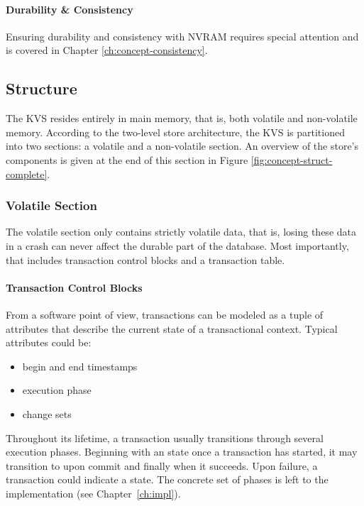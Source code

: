 \paragraph{Durability \& Consistency}

Ensuring durability and consistency with \ac{NVRAM} requires special attention
and is covered in Chapter \ref{ch:concept-consistency}.

\vfill

\subsection{Structure}

The \ac{KVS} resides entirely in main memory, that is, both volatile and
non-volatile memory. According to the two-level store architecture, the \ac{KVS}
is partitioned into two sections: a volatile and a non-volatile section. An
overview of the store's components is given at the end of this section in Figure
\ref{fig:concept-struct-complete}.

\subsubsection{Volatile Section}

The volatile section only contains strictly volatile data, that is, losing these
data in a crash can never affect the durable part of the database. Most
importantly, that includes transaction control blocks and a transaction table.

\paragraph{Transaction Control Blocks}

From a software point of view, transactions can be modeled as a tuple of
attributes that describe the current state of a transactional context. Typical
attributes could be:

\begin{itemize}
    \item begin and end timestamps
    \item execution phase
    \item change sets
\end{itemize}

Throughout its lifetime, a transaction usually transitions through several
execution phases. Beginning with an  state once a transaction has
started, it may transition to  upon commit and finally
 when it succeeds. Upon failure, a transaction could indicate a
 state. The concrete set of phases is left to the implementation (see Chapter~\ref{ch:impl}).

